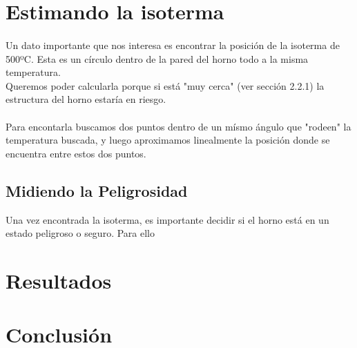 \documentclass[12pt]{article}
\begin{document}

\section{Estimando la isoterma}

\paragraph{} Un dato importante que nos interesa es encontrar la posición de la isoterma de 500ºC. Esta es un círculo dentro de la pared del horno todo a la misma temperatura. \\
Queremos poder calcularla porque si está "muy cerca" (ver sección 2.2.1) la estructura del horno estaría en riesgo. %


\paragraph{} Para encontarla buscamos dos puntos dentro de un mísmo ángulo que "rodeen" la temperatura buscada, y luego aproximamos linealmente la posición donde se encuentra entre estos dos puntos.


\subsection{Midiendo la Peligrosidad}

Una vez encontrada la isoterma, es importante decidir si el horno está en un estado peligroso o seguro. Para ello %

\section{Resultados}


\section{Conclusión}

\end{document}
